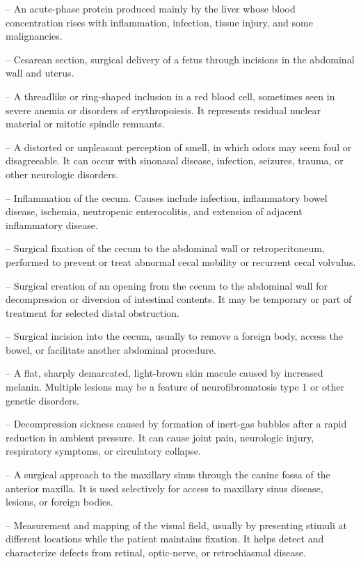 -- An acute-phase protein produced mainly by the liver whose blood concentration rises with inflammation, infection, tissue injury, and some malignancies.

-- Cesarean section, surgical delivery of a fetus through incisions in the abdominal wall and uterus.


-- A threadlike or ring-shaped inclusion in a red blood cell, sometimes seen in severe anemia or disorders of erythropoiesis. It represents residual nuclear material or mitotic spindle remnants.

-- A distorted or unpleasant perception of smell, in which odors may seem foul or disagreeable. It can occur with sinonasal disease, infection, seizures, trauma, or other neurologic disorders.

-- Inflammation of the cecum. Causes include infection, inflammatory bowel disease, ischemia, neutropenic enterocolitis, and extension of adjacent inflammatory disease.

-- Surgical fixation of the cecum to the abdominal wall or retroperitoneum, performed to prevent or treat abnormal cecal mobility or recurrent cecal volvulus.


-- Surgical creation of an opening from the cecum to the abdominal wall for decompression or diversion of intestinal contents. It may be temporary or part of treatment for selected distal obstruction.

-- Surgical incision into the cecum, usually to remove a foreign body, access the bowel, or facilitate another abdominal procedure.

-- A flat, sharply demarcated, light-brown skin macule caused by increased melanin. Multiple lesions may be a feature of neurofibromatosis type 1 or other genetic disorders.

-- Decompression sickness caused by formation of inert-gas bubbles after a rapid reduction in ambient pressure. It can cause joint pain, neurologic injury, respiratory symptoms, or circulatory collapse.


-- A surgical approach to the maxillary sinus through the canine fossa of the anterior maxilla. It is used selectively for access to maxillary sinus disease, lesions, or foreign bodies.

-- Measurement and mapping of the visual field, usually by presenting stimuli at different locations while the patient maintains fixation. It helps detect and characterize defects from retinal, optic-nerve, or retrochiasmal disease.

